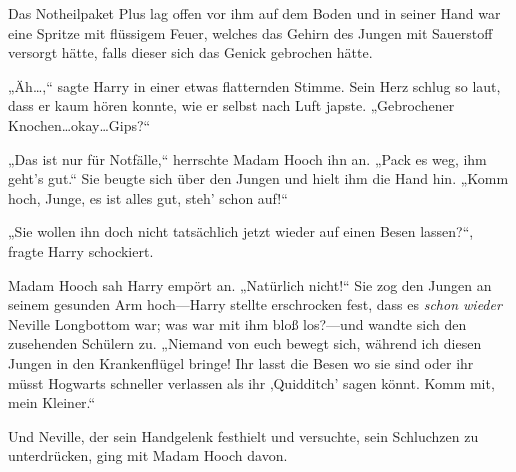 Das Notheilpaket Plus lag offen vor ihm auf dem Boden und in seiner Hand war eine Spritze mit flüssigem Feuer, welches das Gehirn des Jungen mit Sauerstoff versorgt hätte, falls dieser sich das Genick gebrochen hätte.

„Äh…,“ sagte Harry in einer etwas flatternden Stimme. Sein Herz schlug so laut, dass er kaum hören konnte, wie er selbst nach Luft japste. „Gebrochener Knochen…okay…Gips?“

„Das ist nur für Notfälle,“ herrschte Madam Hooch ihn an. „Pack es weg, ihm geht’s gut.“ Sie beugte sich über den Jungen und hielt ihm die Hand hin. „Komm hoch, Junge, es ist alles gut, steh’ schon auf!“

„Sie wollen ihn doch nicht tatsächlich jetzt wieder auf einen Besen lassen?“, fragte Harry schockiert.

Madam Hooch sah Harry empört an. „Natürlich nicht!“ Sie zog den Jungen an seinem gesunden Arm hoch—Harry stellte erschrocken fest, dass es \emph{schon wieder} Neville Longbottom war; was war mit ihm bloß los?—und wandte sich den zusehenden Schülern zu. „Niemand von euch bewegt sich, während ich diesen Jungen in den Krankenflügel bringe! Ihr lasst die Besen wo sie sind oder ihr müsst Hogwarts schneller verlassen als ihr ‚Quidditch’ sagen könnt. Komm mit, mein Kleiner.“

Und Neville, der sein Handgelenk festhielt und versuchte, sein Schluchzen zu unterdrücken, ging mit Madam Hooch davon.

